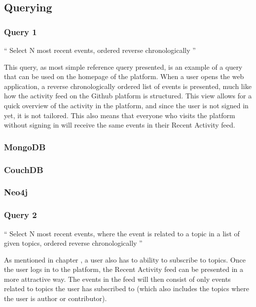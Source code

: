 \subsection{Querying}
\label{subsec:querying}

\subsubsection{Query 1}
\label{subsubsec:query-1}

``
Select N most recent events, ordered reverse chronologically
''

This query, as most simple reference query presented, is an example of a query that can be used on the homepage of the platform.
When a user opens the web application, a reverse chronologically ordered list of events is presented, much like how the activity feed on the Github platform is structured.
This view allows for a quick overview of the activity in the platform, and since the user is not signed in yet, it is not tailored.
This also means that everyone who visits the platform without signing in will receive the same events in their Recent Activity feed.

\subsubsection*{MongoDB}
\subsubsection*{CouchDB}
\subsubsection*{Neo4j}

\subsubsection{Query 2}
\label{subsubsec:query-2}

``
Select N most recent events, where the event is related to a topic in a list of given topics, ordered reverse chronologically
''

As mentioned in chapter , a user also has to ability to subscribe to topics.
Once the user logs in to the platform, the Recent Activity feed can be presented in a more attractive way.
The events in the feed will then consist of only events related to topics the user has subscribed to (which also includes the topics where the user is author or contributor).

